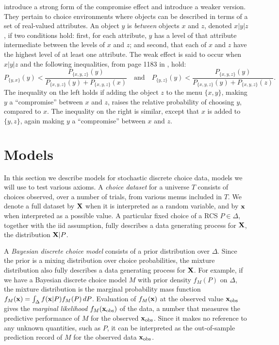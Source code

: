 \documentclass[11pt,letter]{article}
\newcommand{\menu}{menu}
\newcommand{\menus}{menus}
\newcommand{\bin}[2]{P_{\{#1,#2\}}(#1)}
\begin{document}
 introduce a strong form of the compromise effect and  introduce a weaker version.
They pertain to choice environments where objects can be described in terms of a set of real-valued attributes.
An object $y$ is {\em between} objects $x$ and $z$, denoted $x|y|z$, if two conditions hold: first, for each attribute, $y$ has a level of that attribute intermediate between the levels of $x$ and $z$; and second, that each of $x$ and $z$ have the highest level of at least one attribute.
The weak effect is said to occur when $x|y|z$ and the following inequalities, from page 1183 in , hold:
\[
	\bin{y}{x} < \frac{P_{\{x,y,z\}}(y)}{P_{\{x,y,z\}}(y) + P_{\{x,y,z\}}(x)}
	\quad \mbox{and} \quad
	\bin{y}{z} < \frac{P_{\{x,y,z\}}(y)}{P_{\{x,y,z\}}(y) + P_{\{x,y,z\}}(z)}.
\]
The inequality on the left holds if adding the object $z$ to the \menu{} $\{x,y\}$, making $y$ a ``compromise'' between $x$ and $z$, raises the relative probability of choosing $y$, compared to $x$.
The inequality on the right is similar, except that $x$ is added to $\{y,z\}$, again making $y$ a ``compromise'' between $x$ and $z$.

\section{Models}\label{s:models}

In this section we describe models for stochastic discrete choice data, models we will use to test various axioms.
A {\em choice dataset} for a universe $T$ consists of choices observed, over a number of trials, from various \menus{} included in $T$.
We denote a full dataset by $\bf{X}$ when it is interpreted as a random variable, and by $\bf{x}$ when interpreted as a possible value.
A particular fixed choice of a RCS $P \in \Delta$, together with the iid assumption, fully describes a data generating process for $\bf{X}$, the distribution ${\bf X}|P$.

A {\em Bayesian discrete choice model} consists of a prior distribution over $\Delta$.
Since the prior is a mixing distribution over choice probabilities, the mixture distribution also fully describes a data generating process for ${\bf X}$.
For example, if we have a Bayesian discrete choice model $M$ with prior density $f_M(P)$ on $\Delta$, the mixture distribution is the marginal probability mass function $f_M({\bf x}) = \int_\Delta f({\bf x}|P) f_M(P) \,dP$.
Evaluation of $f_M({\bf x})$ at the observed value ${\bf x}_{\mathrm{obs}}$ gives the {\em marginal likelihood} $f_M({\bf x}_{\mathrm{obs}})$ of the data, a number that measures the predictive performance of $M$ for the observed ${\bf x}_{\mathrm{obs}}$.
Since it makes no reference to any unknown quantities, such as $P$, it can be interpreted as the out-of-sample prediction record of $M$ for the observed data ${\bf x}_{\mathrm{obs}}$.
\end{document}
